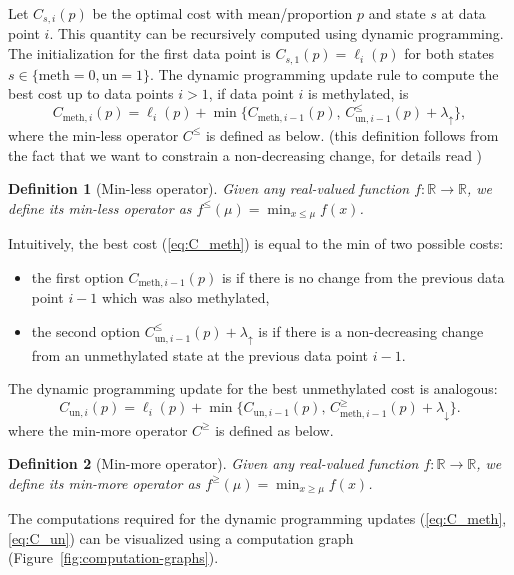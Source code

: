 \documentclass[12pt]{article}
\newcommand{\RR}{\mathbb R}
\newtheorem{definition}{Definition}
\begin{document}
Let $C_{s,i}(p)$ be the optimal cost with mean/proportion $p$ and
state $s$ at data point $i$. This quantity can be recursively computed
using dynamic programming. The initialization for the first data point
is $ C_{s,1}(p) = \ell_i(p)$ for both states
$s\in\{\text{meth}=0,\text{un}=1\}$. The dynamic programming update
rule to compute the best cost up to data points $i>1$, if data point
$i$ is methylated, is
\begin{equation}
\label{eq:C_meth}
   C_{\text{meth},i}(p) = \ell_i(p) + \min\{
  C_{\text{meth},i-1}(p)
  ,\,
  C^\leq_{\text{un},i-1}(p) + \lambda_\uparrow
  \},
\end{equation}
where the min-less operator $C^\leq$ is defined as below. (this
definition follows from the fact that we want to constrain a
non-decreasing change, for details read \citet{HockingGFPOP})
\begin{definition}[Min-less operator]
\label{def:min-less}
  Given any real-valued function $f:\RR\rightarrow\RR$, we define its min-less
  operator as $f^\leq(\mu)=\min_{x\leq \mu} f(x)$.
\end{definition}
Intuitively, the best cost (\ref{eq:C_meth}) is equal to the min of two possible costs: 
\begin{itemize}
\item the first option $C_{\text{meth},i-1}(p)$ is if there is no
  change from the previous data point $i-1$ which was also methylated,
\item the second option $C^\leq_{\text{un},i-1}(p) + \lambda_\uparrow$
  is if there is a non-decreasing change from an unmethylated state at
  the previous data point $i-1$.
\end{itemize}
The dynamic programming update for the best unmethylated cost is analogous:
\begin{equation}
\label{eq:C_un}
   C_{\text{un},i}(p) = \ell_i(p) + \min\{
  C_{\text{un},i-1}(p)
  ,\,
  C^\geq_{\text{meth},i-1}(p) + \lambda_\downarrow
  \}.
\end{equation}
where the min-more operator $C^\geq$ is defined as below.
\begin{definition}[Min-more operator]
\label{def:min-more}
  Given any real-valued function $f:\RR\rightarrow\RR$, we define its min-more
  operator as $f^\geq(\mu)=\min_{x\geq \mu} f(x)$.
\end{definition}

The computations required for the dynamic programming updates
(\ref{eq:C_meth},\ref{eq:C_un}) can be visualized using a computation graph
(Figure~\ref{fig:computation-graphs}).
\end{document}
